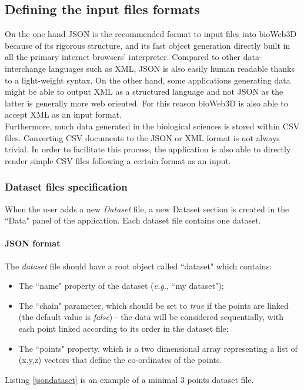 \documentclass[10pt]{bmc_article}
\newenvironment{bmcformat}{\baselineskip20pt\sloppy\setboolean{publ}{false}}{\baselineskip20pt\sloppy}
\begin{document}
\begin{bmcformat}
\subsection{Defining the input files formats}
On the one hand JSON is the recommended format to input files into bioWeb3D because of its rigorous structure, and its fast object generation directly built in all the primary internet browsers' interpreter. Compared to other data-interchange languages such as XML, JSON is also easily human readable thanks to a light-weight syntax. On the other hand, some applications generating data might be able to output XML as a structured language and not JSON as the latter is generally more web oriented. For this reason bioWeb3D is also able to accept XML as an input format.\\
Furthermore, much data generated in the biological sciences is stored within CSV files. Converting CSV documents to the JSON or XML format is not always trivial. In order to facilitate this process, the application is also able to directly render simple CSV files following a certain format as an input.


\subsubsection{Dataset files specification}
When the user adds a new {\it{Dataset}} file, a new Dataset section is created in the ``Data" panel of the application. Each dataset file contains one dataset.\\
\paragraph{JSON format}
The {\it{dataset}} file should have a root object called ``dataset" which contains: \begin{itemize}
\item{The ``name" property of the dataset (\textit{e.g.}, ``my dataset");}
\item{The ``chain" parameter, which should be set to \textit{true} if the points are linked (the default value is \textit{false}) - the data will be considered sequentially, with each point linked according to its order in the dataset file;}
\item{The ``points" property, which is a two dimensional array representing a list of (x,y,z) vectors that define the co-ordinates of the points.}
\end{itemize}

Listing \ref{jsondataset} is an example of a minimal 3 points dataset file.


\end{bmcformat}
\end{document}

